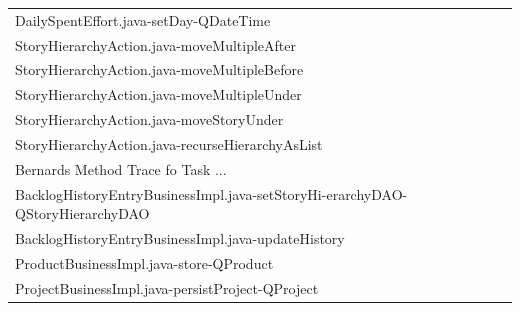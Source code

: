 \begin{table}[t!]
\begin{tabular}{l}
     DailySpentEffort.java-setDay-QDateTime                                                                                \\%
     StoryHierarchyAction.java-moveMultipleAfter                                                                                 \\%
     StoryHierarchyAction.java-moveMultipleBefore                                                                                \\%
     StoryHierarchyAction.java-moveMultipleUnder                                                                                 \\%
     StoryHierarchyAction.java-moveStoryUnder                                                                                    \\%
     StoryHierarchyAction.java-recurseHierarchyAsList                                                                            \\%
%
%
\midrule
\midrule
Bernards Method Trace fo Task ... \\%
 \midrule
     BacklogHistoryEntryBusinessImpl.java-setStoryHi-erarchyDAO-QStoryHierarchyDAO \\%
     BacklogHistoryEntryBusinessImpl.java-updateHistory                          \\%
     ProductBusinessImpl.java-store-QProduct                                    \\%
     ProjectBusinessImpl.java-persistProject-QProject                             \\%

\end{tabular}
\end{table}

